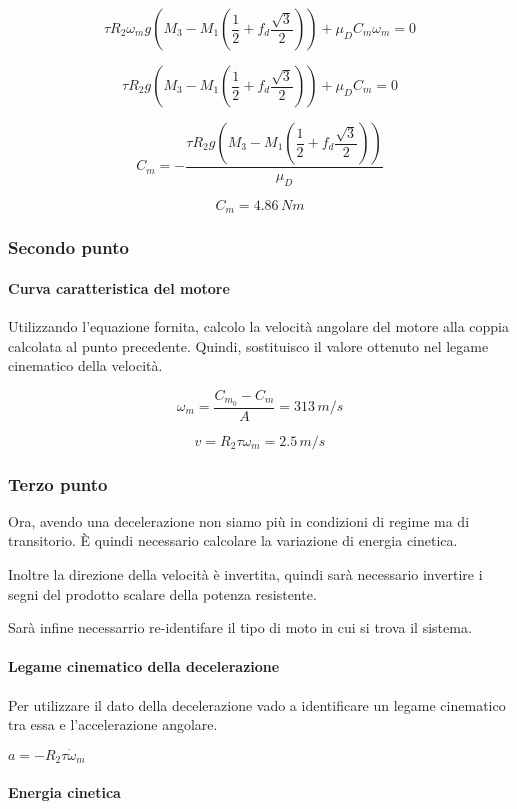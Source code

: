 \documentclass[main.tex]{subfiles}
\begin{document}
\[
	\tau R_2\omega_m g(M_3 - M_1(\dfrac{1}{2} + f_d\dfrac{\sqrt{3}}{2})) +\mu_DC_m\omega_m = 0
\]

\[
	\tau R_2 g(M_3 - M_1(\dfrac{1}{2} + f_d\dfrac{\sqrt{3}}{2})) +\mu_DC_m = 0
\]

\[
	C_m = -\dfrac{\tau R_2 g(M_3 - M_1(\dfrac{1}{2} + f_d\dfrac{\sqrt{3}}{2}))}{\mu_D}
\]

\[
	C_m = 4.86\,Nm
\]

\subsubsection{Secondo punto}

\paragraph{Curva caratteristica del motore} Utilizzando l'equazione fornita, calcolo la velocità angolare del motore alla coppia calcolata al punto precedente. Quindi, sostituisco il valore ottenuto nel legame cinematico della velocità.

\[
	\omega_m = \dfrac{C_{m_0} -C_m}{A} = 313\,m/s
\]

\[
	v = R_2 \tau \omega_m = 2.5\,m/s
\]

\subsubsection{Terzo punto}

Ora, avendo una decelerazione non siamo più in condizioni di regime ma di transitorio. È quindi necessario calcolare la variazione di energia cinetica.

Inoltre la direzione della velocità è invertita, quindi sarà necessario invertire i segni del prodotto scalare della potenza resistente.

Sarà infine necessarrio re-identifare il tipo di moto in cui si trova il sistema.

\paragraph{Legame cinematico della decelerazione} Per utilizzare il dato della decelerazione vado a identificare un legame cinematico tra essa e l'accelerazione angolare.

$a = -R_2 \tau \dot{\omega}_m$

\paragraph{Energia cinetica}
\end{document}
